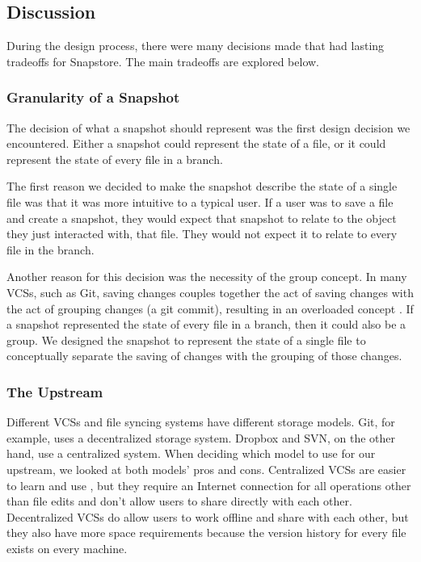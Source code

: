 \subsection{Discussion}

During the design process, there were many decisions made that had lasting tradeoffs for Snapstore. The main tradeoffs are explored below.

\subsubsection{Granularity of a Snapshot}

The decision of what a snapshot should represent was the first design decision we encountered. Either a snapshot could represent the state of a file, or it could represent the state of every file in a branch. 

The first reason we decided to make the snapshot describe the state of a single file was that it was more intuitive to a typical user. If a user was to save a file and create a snapshot, they would expect that snapshot to relate to the object they just interacted with, that file. They would not expect it to relate to every file in the branch.

Another reason for this decision was the necessity of the group concept. In many VCSs, such as Git, saving changes couples together the act of saving changes with the act of grouping changes (a git commit), resulting in an overloaded concept \cite{Jackson}. If a snapshot represented the state of every file in a branch, then it could also be a group. We designed the snapshot to represent the state of a single file to conceptually separate the saving of changes with the grouping of those changes.

\subsubsection{The Upstream}

Different VCSs and file syncing systems have different storage models. Git, for example, uses a decentralized storage system. Dropbox and SVN, on the other hand, use a centralized system. When deciding which model to use for our upstream, we looked at both models' pros and cons. Centralized VCSs are easier to learn and use \cite{Brindescu}, but they require an Internet connection for all operations other than file edits and don't allow users to share directly with each other. Decentralized VCSs do allow users to work offline and share with each other, but they also have more space requirements because the version history for every file exists on every machine.

